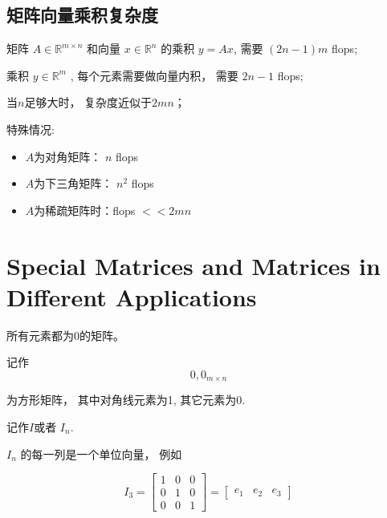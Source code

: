 \subsection{矩阵向量乘积复杂度}

矩阵 $ A \in \mathbb{R}^{m \times n} $ 和向量 $ x \in \mathbb{R}^{n} $ 的乘积 $ {y}={A} x $, 需要 $ (2 {n}-1) {m} $ flops;

乘积 $ y \in \mathbb{R}^{m} $ , 每个元素需要做向量内积， 需要 $ 2 n-1 $ flops;

当$n$足够大时， 复杂度近似于$2mn$；

特殊情况:

\begin{itemize}
    \item $A$为对角矩阵： $ {n} $ flops
    \item $A$为下三角矩阵： $ n^{2} $ flops
    \item $A$为稀疏矩阵时：flops $ <<2 m n $
\end{itemize}


\section{Special Matrices and Matrices in Different Applications}

\begin{definition}
    所有元素都为0的矩阵。

    记作\begin{equation}0, 0_{m \times n} \end{equation}
\end{definition}

\begin{definition}[单位矩阵]
    为方形矩阵， 其中对角线元素为1, 其它元素为0.

    记作$I$或者 $ {I}_{n} $.
\end{definition}

\begin{corollary}
  $ {I}_{n} $ 的每一列是一个单位向量， 例如

\begin{equation}
{I}_{3}=\left[\begin{array}{lll}
1 & 0 & 0 \\
0 & 1 & 0 \\
0 & 0 & 1
\end{array}\right]=\left[\begin{array}{lll}
e_{1} & e_{2} & e_{3}
\end{array}\right]
\end{equation}
\end{corollary}

